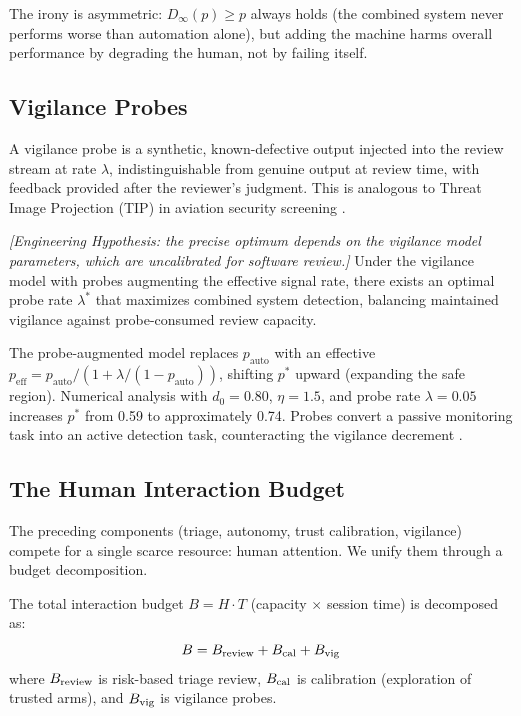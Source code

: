 The irony is asymmetric: $D_\infty(p) \geq p$ always holds (the combined system never performs worse than automation alone), but adding the machine harms overall performance by degrading the human, not by failing itself.

\subsection{Vigilance Probes}

\begin{definition}
A vigilance probe is a synthetic, known-defective output injected into the review stream at rate $\lambda$, indistinguishable from genuine output at review time, with feedback provided after the reviewer's judgment. This is analogous to Threat Image Projection (TIP) in aviation security screening \citep{wolfe2005low}.
\end{definition}

\begin{theorem}
\emph{[Engineering Hypothesis: the precise optimum depends on the vigilance model parameters, which are uncalibrated for software review.]}
\label{thm:probe-rate}
Under the vigilance model with probes augmenting the effective signal rate, there exists an optimal probe rate $\lambda^*$ that maximizes combined system detection, balancing maintained vigilance against probe-consumed review capacity.
\end{theorem}

The probe-augmented model replaces $p_{\text{auto}}$ with an effective $p_{\text{eff}} = p_{\text{auto}} / (1 + \lambda/(1-p_{\text{auto}}))$, shifting $p^*$ upward (expanding the safe region). Numerical analysis with $d_0 = 0.80$, $\eta = 1.5$, and probe rate $\lambda = 0.05$ increases $p^*$ from 0.59 to approximately 0.74. Probes convert a passive monitoring task into an active detection task, counteracting the vigilance decrement \citep{warm2008vigilance}.

\subsection{The Human Interaction Budget}

The preceding components (triage, autonomy, trust calibration, vigilance) compete for a single scarce resource: human attention. We unify them through a budget decomposition.

\begin{definition}
\label{def:budget}
The total interaction budget $B = H \cdot T$ (capacity $\times$ session time) is decomposed as:
\begin{equation}
B = B_{\textup{review}} + B_{\textup{cal}} + B_{\textup{vig}}
\end{equation}
where $B_{\textup{review}}$ is risk-based triage review, $B_{\textup{cal}}$ is calibration (exploration of trusted arms), and $B_{\textup{vig}}$ is vigilance probes.
\end{definition}


